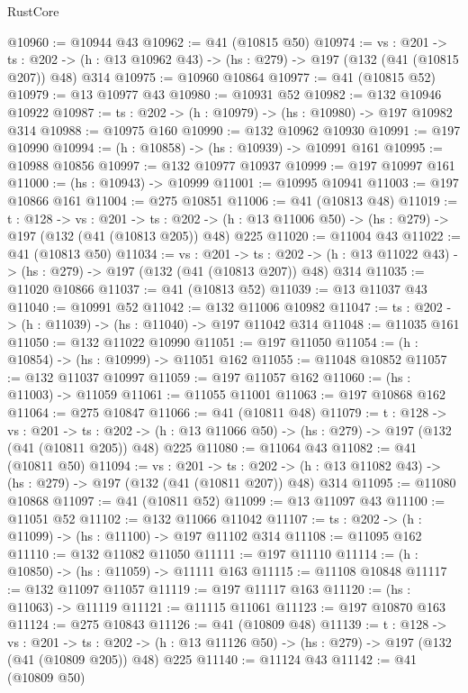 \begin{lexlean}{RustCore}
\begin{coremodule}
@10960 := @10944 @43
@10962 := @41 (@10815 @50)
@10974 := {vs : @201} ->
  {ts : @202} -> (h : @13 @10962 @43) -> (hs : @279) -> @197 (@132 (@41 (@10815 @207)) @48) @314
@10975 := @10960 @10864
@10977 := @41 (@10815 @52)
@10979 := @13 @10977 @43
@10980 := @10931 @52
@10982 := @132 @10946 @10922
@10987 := {ts : @202} -> (h : @10979) -> (hs : @10980) -> @197 @10982 @314
@10988 := @10975 @160
@10990 := @132 @10962 @10930
@10991 := @197 @10990
@10994 := (h : @10858) -> (hs : @10939) -> @10991 @161
@10995 := @10988 @10856
@10997 := @132 @10977 @10937
@10999 := @197 @10997 @161
@11000 := (hs : @10943) -> @10999
@11001 := @10995 @10941
@11003 := @197 @10866 @161
@11004 := @275 @10851
@11006 := @41 (@10813 @48)
@11019 := {t : @128} ->
  {vs : @201} ->
  {ts : @202} -> (h : @13 @11006 @50) -> (hs : @279) -> @197 (@132 (@41 (@10813 @205)) @48) @225
@11020 := @11004 @43
@11022 := @41 (@10813 @50)
@11034 := {vs : @201} ->
  {ts : @202} -> (h : @13 @11022 @43) -> (hs : @279) -> @197 (@132 (@41 (@10813 @207)) @48) @314
@11035 := @11020 @10866
@11037 := @41 (@10813 @52)
@11039 := @13 @11037 @43
@11040 := @10991 @52
@11042 := @132 @11006 @10982
@11047 := {ts : @202} -> (h : @11039) -> (hs : @11040) -> @197 @11042 @314
@11048 := @11035 @161
@11050 := @132 @11022 @10990
@11051 := @197 @11050
@11054 := (h : @10854) -> (hs : @10999) -> @11051 @162
@11055 := @11048 @10852
@11057 := @132 @11037 @10997
@11059 := @197 @11057 @162
@11060 := (hs : @11003) -> @11059
@11061 := @11055 @11001
@11063 := @197 @10868 @162
@11064 := @275 @10847
@11066 := @41 (@10811 @48)
@11079 := {t : @128} ->
  {vs : @201} ->
  {ts : @202} -> (h : @13 @11066 @50) -> (hs : @279) -> @197 (@132 (@41 (@10811 @205)) @48) @225
@11080 := @11064 @43
@11082 := @41 (@10811 @50)
@11094 := {vs : @201} ->
  {ts : @202} -> (h : @13 @11082 @43) -> (hs : @279) -> @197 (@132 (@41 (@10811 @207)) @48) @314
@11095 := @11080 @10868
@11097 := @41 (@10811 @52)
@11099 := @13 @11097 @43
@11100 := @11051 @52
@11102 := @132 @11066 @11042
@11107 := {ts : @202} -> (h : @11099) -> (hs : @11100) -> @197 @11102 @314
@11108 := @11095 @162
@11110 := @132 @11082 @11050
@11111 := @197 @11110
@11114 := (h : @10850) -> (hs : @11059) -> @11111 @163
@11115 := @11108 @10848
@11117 := @132 @11097 @11057
@11119 := @197 @11117 @163
@11120 := (hs : @11063) -> @11119
@11121 := @11115 @11061
@11123 := @197 @10870 @163
@11124 := @275 @10843
@11126 := @41 (@10809 @48)
@11139 := {t : @128} ->
  {vs : @201} ->
  {ts : @202} -> (h : @13 @11126 @50) -> (hs : @279) -> @197 (@132 (@41 (@10809 @205)) @48) @225
@11140 := @11124 @43
@11142 := @41 (@10809 @50)

\end{coremodule}
\end{lexlean}

